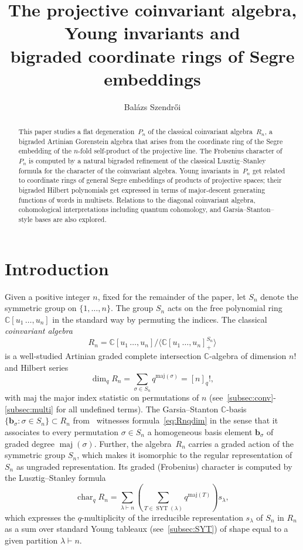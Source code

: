 \documentclass[a4paper,11pt]{amsart}
\title[The projective coinvariant algebra]{The projective coinvariant algebra, Young invariants and \\ bigraded coordinate rings of Segre embeddings}
\author{Bal\'{a}zs Szendr\H{o}i}
\theoremstyle{plain}
\theoremstyle{definition}
\newcommand{\C}{\mathbb{C}}
\DeclareMathOperator{\cha}{char}
\DeclareMathOperator{\SYT}{SYT}
\DeclareMathOperator{\maj}{maj}
\begin{document}
\begin{abstract}\noindent This paper studies a flat degeneration~$P_n$ of the classical coinvariant algebra~$R_n$, a bigraded Artinian Gorenstein algebra that arises from the coordinate ring of the Segre embedding of the $n$-fold self-product of the projective line. The Frobenius character of $P_n$ is computed by a natural bigraded refinement of the classical Lusztig--Stanley formula for the character of the coinvariant algebra. Young invariants in~$P_n$ get related to coordinate rings of general Segre embeddings of products of projective spaces; their bigraded Hilbert polynomials get expressed in terms of major-descent generating functions of words in multisets. Relations to the diagonal coinvariant algebra, cohomological interpretations including quantum cohomology, and Garsia--Stanton--style bases are also explored. 
\end{abstract}
\maketitle

\thispagestyle{empty}

\section{Introduction}

Given a positive integer $n$, fixed for the remainder of the paper, let $S_n$ denote the symmetric group on $\{1,\ldots, n\}$. The group $S_n$ acts on the free polynomial ring $\C[u_1\,\ldots, u_n]$ in the standard way by permuting the indices. 
The classical {\em coinvariant algebra}
\[ R_n = \C[u_1\,\ldots, u_n]/\langle \C[u_1\,\ldots, u_n]^{S_n}_+\rangle
\]
is a well-studied Artinian graded complete intersection $\C$-algebra of dimension $n!$ and Hilbert series 
\begin{equation}
 \label{eq:Rnqdim}   
\dim_{q} R_n  = \sum_{\sigma\in S_n} q^{\mathrm{maj}(\sigma)} = [n]_q!, 
\end{equation}
with $\mathrm{maj}$ the major index statistic on permutations of $n$ (see~\ref{subsec:conv}-\ref{subsec:multi} for all 
undefined terms). The Garsia--Stanton $\C$-basis $\{\mathbf{b}_\sigma\colon \sigma\in S_n\}\subset R_n$ from~\cite{GS} witnesses formula~\eqref{eq:Rnqdim} in the sense that it associates to every permutation $\sigma\in S_n$ a homogeneous basis element $\mathbf{b}_\sigma$ of graded degree $\maj(\sigma)$. 
Further, the algebra~$R_n$ carries a graded action of the symmetric group $S_n$, which makes it isomorphic to the regular representation of $S_n$ as ungraded representation. Its graded (Frobenius) character is computed by the Lusztig--Stanley formula~\cite[Prop. 4.11]{Stan}
\begin{equation} \label{eq:StanLusz}\cha_{q} R_n = \sum_{\lambda\vdash n} \left(\sum_{T\in\SYT(\lambda)} q^{\mathrm{maj}(T)}\right)s_\lambda,
\end{equation}
which expresses the $q$-multiplicity of the irreducible representation $s_\lambda$ of $S_n$ in $R_n$ as a sum over standard Young tableaux (see~\ref{subsec:SYT}) of shape equal to a given partition $\lambda\vdash n$. 
\end{document}
